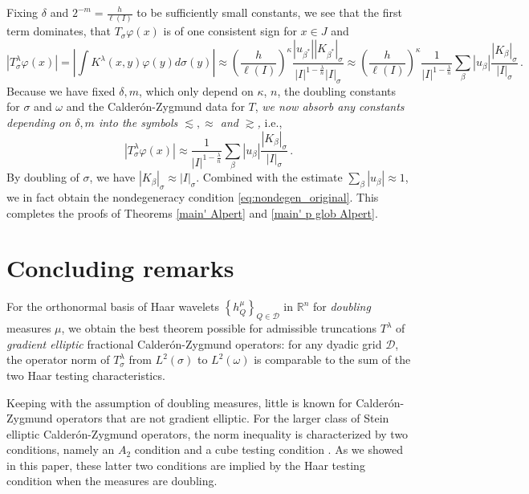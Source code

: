 \documentclass{amsart}%
\theoremstyle{plain}
\numberwithin{equation}{section}
\begin{document}
Fixing $\delta$ and $2^{-m} = \frac{h}{\ell \left (I \right)}$ to be sufficiently small constants, we see that the first term dominates, that $T_{\sigma} \varphi (x)$ is of one consistent sign for $x \in J$ and 
\[
	\left | T_{\sigma} ^{\lambda} \varphi (x) \right | = \left | \int K ^{\lambda } (x,y) \varphi (y) d\sigma(y) \right | \approx \left ( \frac{h}{\ell \left (I \right)} \right )^{\kappa} \frac{ \left | u_{\beta^*} \right | \left | K _{\beta^*} \right | _{\sigma} }{ \left |I \right|^{1 - \frac{\lambda}{n}} \left | I \right| _{\sigma}}  \approx \left ( \frac{h}{\ell \left (I \right)} \right )^{\kappa} \frac{1}{\left |I \right|^{1 - \frac{\lambda}{n}}} \sum\limits_{\beta} \left | u_{\beta} \right | \frac{\left | K _{\beta} \right | _{\sigma}}{\left |I \right|_{\sigma}} \, . 
\]
 Because we have fixed $\delta, m$, which only depend on $\kappa$, $n$, the doubling constants for $\sigma$ and $\omega$ and the Calder\'on-Zygmund data for $T$, \emph{we now absorb any constants depending on $\delta, m$ into the symbols $\lesssim, \approx$ and $\gtrsim$,} i.e.,
 \[
	\left | T_{\sigma} ^{\lambda} \varphi (x) \right | \approx  \frac{1}{\left |I \right|^{1 - \frac{\lambda}{n}}} \sum\limits_{\beta} \left | u_{\beta} \right | \frac{\left | K _{\beta} \right | _{\sigma}}{\left | I \right |_{\sigma}} \, .
\]
By doubling of $\sigma$, we have $\left | K _{\beta} \right | _{\sigma} \approx \left | I \right |_{\sigma}$. Combined with the estimate $\sum\limits_{\beta} \left | u _{\beta} \right | \approx 1$, we in fact obtain the nondegeneracy condition \eqref{eq:nondegen_original}. This completes the proofs of Theorems \ref{main' Alpert} and \ref{main' p glob Alpert}.


\section{Concluding remarks}

For the orthonormal basis of Haar wavelets $\left\{
h_{Q}^{\mu}\right\}  _{Q\in\mathcal{D}}$ in $\mathbb{R}^{n}$ for
\emph{doubling} measures $\mu$, we obtain the best theorem possible for
admissible truncations $T^{\lambda}$ of \emph{gradient elliptic} fractional
Calder\'{o}n-Zygmund operators: for any dyadic
grid $\mathcal{D}$, the operator norm of $T^{\lambda} _{\sigma}$ from $L^{2}\left(  \sigma\right)
$ to $L^{2}\left(  \omega\right)  $ is comparable to the sum of the two Haar
testing characteristics.

Keeping with the assumption of doubling measures, little is known for
Calder\'{o}n-Zygmund operators that are not gradient elliptic. For the larger class of Stein elliptic Calder\'on-Zygmund operators, the norm inequality is characterized by two conditions, namely an $A_2$ condition and a cube testing condition \cite{AlSaUr}. As we showed in this paper, these latter two conditions are implied by the Haar testing condition when the measures are doubling. 
\end{document}

